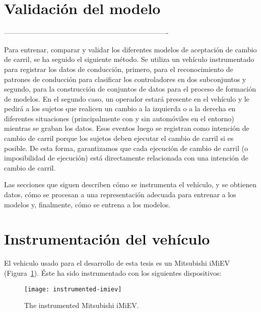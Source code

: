 \section{Validación del modelo}






----------------------------------------------------------------------


Para entrenar, comparar y validar los diferentes modelos de aceptación de cambio de carril, se ha seguido el siguiente método. Se utiliza un vehículo instrumentado para registrar los datos de conducción, primero, para el reconocimiento de patrones de conducción para clasificar los controladores en dos subconjuntos y segundo, para la construcción de conjuntos de datos para el proceso de formación de modelos. En el segundo caso, un operador estará presente en el vehículo y le pedirá a los sujetos que realicen un cambio a la izquierda o a la derecha en diferentes situaciones (principalmente con y sin automóviles en el entorno) mientras se graban los datos. Esos eventos luego se registran como intención de cambio de carril porque los sujetos deben ejecutar el cambio de carril si es posible. De esta forma, garantizamos que cada ejecución de cambio de carril (o imposibilidad de ejecución) está directamente relacionada con una intención de cambio de carril.

Las secciones que siguen describen cómo se instrumenta el vehículo, y se obtienen datos, cómo se procesan a una representación adecuada para entrenar a los modelos y, finalmente, cómo se entrena a los modelos.

\section{Instrumentación del vehículo}

El vehiculo usado para el desarrollo de esta tesis es un Mitsubishi iMiEV (Figura~\ref{fig:instrumented-imiev}). Éste ha sido instrumentado con los siguientes dispositivos:

\begin{figure}
	\texttt{[image: instrumented-imiev]}
	\caption{The instrumented Mitsubishi iMiEV.}
	\label{fig:instrumented-imiev}
\end{figure}


